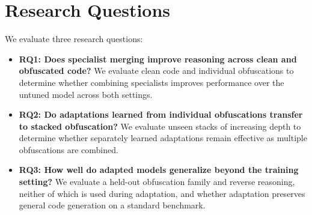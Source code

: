 \section{Research Questions}
\label{sec:rqs}

We evaluate three research questions:

\begin{itemize}

    \item \textbf{RQ1: Does specialist merging improve reasoning across clean
    and obfuscated code?}
    We evaluate clean code and individual obfuscations to determine whether
    combining specialists improves performance over the untuned model across
    both settings.

    \item \textbf{RQ2: Do adaptations learned from individual obfuscations
    transfer to stacked obfuscation?}
    We evaluate unseen stacks of increasing depth to determine whether
    separately learned adaptations remain effective as multiple obfuscations
    are combined.

    \item \textbf{RQ3: How well do adapted models generalize beyond the
    training setting?}
    We evaluate a held-out obfuscation family and reverse reasoning, neither of
    which is used during adaptation, and whether adaptation preserves general
    code generation on a standard benchmark.

\end{itemize}
